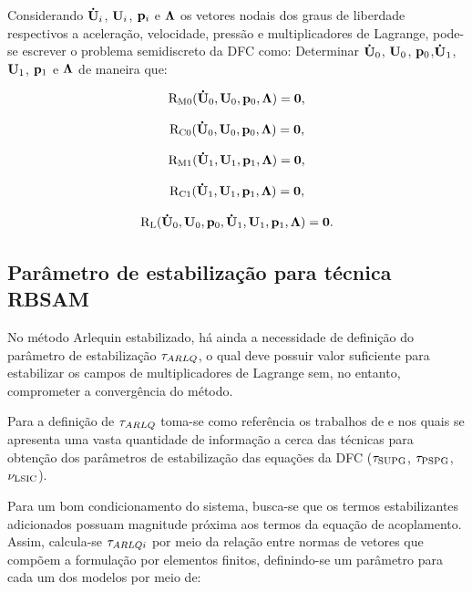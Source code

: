 Considerando $\mathbf{\dot{U}}_i$, $\mathbf{U}_i$, $\mathbf{p}_i$ e $\boldsymbol{\Lambda}$ os vetores nodais dos graus de liberdade respectivos a aceleração, velocidade, pressão e multiplicadores de Lagrange, pode-se escrever o problema semidiscreto da DFC como: Determinar $\mathbf{\dot{U}}_0$, $\mathbf{U}_0$, $\mathbf{p}_0$,$\mathbf{\dot{U}}_1$, $\mathbf{U}_1$, $\mathbf{p}_1$ e $\boldsymbol{\Lambda}$ de maneira que:

\begin{align}
	\mathrm{R}_\mathrm{M0}(\mathbf{\dot{U}}_0,\mathbf{U}_0,\mathbf{p}_0,\boldsymbol{\Lambda}) = \mathbf{0}, \label{eq:resid_semi_discr_QM_0}
\end{align}

\begin{align}
	\mathrm{R}_\mathrm{C0}(\mathbf{\dot{U}}_0,\mathbf{U}_0,\mathbf{p}_0,\boldsymbol{\Lambda}) = \mathbf{0}, 
\end{align}

\begin{align}
	\mathrm{R}_\mathrm{M1}(\mathbf{\dot{U}}_1,\mathbf{U}_1,\mathbf{p}_1,\boldsymbol{\Lambda}) = \mathbf{0},
\end{align}

\begin{align}
	\mathrm{R}_\mathrm{C1}(\mathbf{\dot{U}}_1,\mathbf{U}_1,\mathbf{p}_1,\boldsymbol{\Lambda}) = \mathbf{0},
\end{align}

\begin{align}
	\mathrm{R}_\mathrm{L}(\mathbf{\dot{U}}_0,\mathbf{U}_0,\mathbf{p}_0,\mathbf{\dot{U}}_1,\mathbf{U}_1,\mathbf{p}_1,\boldsymbol{\Lambda}) = \mathbf{0}. \label{eq:resid_semi_discr_acopla}
\end{align}


\subsection{Parâmetro de estabilização para técnica RBSAM}

No método Arlequin estabilizado, há ainda a necessidade de definição do parâmetro de estabilização $\tau_{ARLQ}$, o qual deve possuir valor suficiente para estabilizar os campos de multiplicadores de Lagrange sem, no entanto, comprometer a convergência do método. 

Para a definição de $\tau_{ARLQ}$ toma-se como referência os trabalhos de  e  nos quais se apresenta uma vasta quantidade de informação a cerca das técnicas para obtenção dos parâmetros de estabilização das equações da DFC ($\tau_{\mathrm{SUPG}}$, $\tau_{\mathrm{PSPG}}$, $\nu_{\mathrm{LSIC}}$). 
 
Para um bom condicionamento do sistema, busca-se que os termos estabilizantes adicionados possuam magnitude próxima aos termos da equação de acoplamento. Assim, calcula-se $\tau_{ARLQi}$ por meio da relação entre normas de vetores que compõem a formulação por elementos finitos, definindo-se um parâmetro para cada um dos modelos por meio de:

